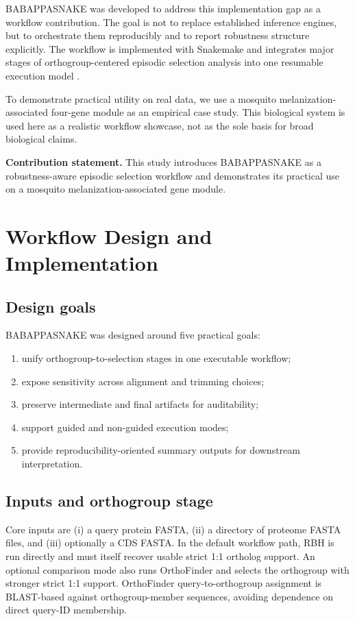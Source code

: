 \documentclass[11pt]{article}
\begin{document}
BABAPPASNAKE was developed to address this implementation gap as a workflow contribution.
The goal is not to replace established inference engines, but to orchestrate them reproducibly and to report robustness structure explicitly.
The workflow is implemented with Snakemake and integrates major stages of orthogroup-centered episodic selection analysis into one resumable execution model \citep{snakemake2012,babappasnake_repo}.

To demonstrate practical utility on real data, we use a mosquito melanization-associated four-gene module as an empirical case study.
This biological system is used here as a realistic workflow showcase, not as the sole basis for broad biological claims.

\textbf{Contribution statement.}
This study introduces BABAPPASNAKE as a robustness-aware episodic selection workflow and demonstrates its practical use on a mosquito melanization-associated gene module.

\section{Workflow Design and Implementation}
\subsection{Design goals}
BABAPPASNAKE was designed around five practical goals:
\begin{enumerate}[leftmargin=*]
  \item unify orthogroup-to-selection stages in one executable workflow;
  \item expose sensitivity across alignment and trimming choices;
  \item preserve intermediate and final artifacts for auditability;
  \item support guided and non-guided execution modes;
  \item provide reproducibility-oriented summary outputs for downstream interpretation.
\end{enumerate}

\subsection{Inputs and orthogroup stage}
Core inputs are (i) a query protein FASTA, (ii) a directory of proteome FASTA files, and (iii) optionally a CDS FASTA.
In the default workflow path, RBH is run directly and must itself recover usable strict 1:1 ortholog support.
An optional comparison mode also runs OrthoFinder and selects the orthogroup with stronger strict 1:1 support.
OrthoFinder query-to-orthogroup assignment is BLAST-based against orthogroup-member sequences, avoiding dependence on direct query-ID membership.
\end{document}
